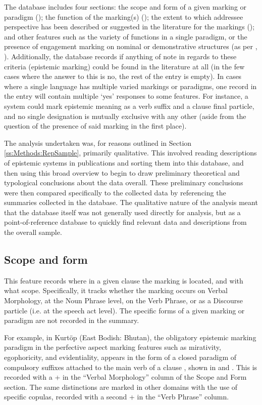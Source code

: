 The database includes four sections: the scope and form of a given marking or paradigm (); the function of the marking(s) (); the extent to which addressee perspective has been described or suggested in the literature for the markings (); and other features such as the variety of functions in a single paradigm, or the presence of engagement marking on nominal or demonstrative structures (as per , ). Additionally, the database records if anything of note in regards to these criteria (epistemic marking) could be found in the literature at all (in the few cases where the answer to this is no, the rest of the entry is empty). In cases where a single language has multiple varied markings or paradigms, one record in the entry will contain multiple `yes' responses to some features. For instance, a system could mark epistemic meaning as a verb suffix and a clause final particle, and no single designation is mutually exclusive with any other (aside from the question of the presence of said marking in the first place).

The analysis undertaken was, for reasons outlined in Section \ref{ss:Methods:RepSample}, primarily qualitative. This involved reading descriptions of epistemic systems in publications and sorting them into this database, and then using this broad overview to begin to draw preliminary theoretical and typological conclusions about the data overall. These preliminary conclusions were then compared specifically to the collected data by referencing the summaries collected in the database. The qualitative nature of the analysis meant that the database itself was not generally used directly for analysis, but as a point-of-reference database to quickly find relevant data and descriptions from the overall sample.

\subsection{Scope and form}\label{ss:Methods:ScopeForm}
This feature records where in a given clause the marking is located, and with what scope. Specifically, it tracks whether the marking occurs on Verbal Morphology, at the Noun Phrase level, on the Verb Phrase, or as a Discourse particle (i.e. at the speech act level). The specific forms of a given marking or paradigm are not recorded in the summary.

For example, in Kurtöp (East Bodish: Bhutan), the obligatory epistemic marking paradigm in the perfective aspect marking features such as mirativity, egophoricity, and evidentiality, appears in the form of a closed paradigm of compulsory suffixes attached to the main verb of a clause \cite{Hyslop2018}, shown in  and . This is recorded with a + in the ``Verbal Morphology'' column of the Scope and Form section. The same distinctions are marked in other domains with the use of specific copulas, recorded with a second + in the ``Verb Phrase'' column.


